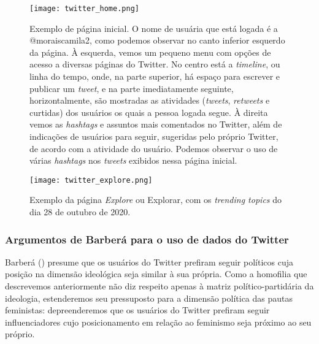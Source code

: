 \documentclass[
	12pt,				%
	openright,			%
	twoside,			%
	a4paper,			%
	english,			%
	brazil				%
	]{abntex2}
\begin{document}
 \begin{figure}[!htbp]
    \centering
    \texttt{[image: twitter\_home.png]}
    \caption{Exemplo de página inicial. O nome de usuária que está logada é a @moraiscamila2, como podemos observar no canto inferior esquerdo da página. À esquerda, vemos um pequeno menu com opções de acesso a diversas páginas do Twitter. No centro está a \emph{timeline}, ou linha do tempo, onde, na parte superior, há espaço para escrever e publicar um \emph{tweet}, e na parte imediatamente seguinte, horizontalmente, são mostradas as atividades (\emph{tweets}, \emph{retweets} e curtidas) dos usuários os quais a pessoa logada segue. À direita vemos as \emph{hashtags} e assuntos mais comentados no Twitter, além de indicações de usuários para seguir, sugeridas pelo próprio Twitter, de acordo com a atividade do usuário. Podemos observar o uso de várias \emph{hashtags} nos \emph{tweets} exibidos nessa página inicial.}
    \label{fig:home}
 \end{figure}

 \begin{figure}[!htbp]
    \centering
    \texttt{[image: twitter\_explore.png]}
    \caption{Exemplo da página \emph{Explore} ou Explorar, com os \emph{trending topics} do dia 28 de outubro de 2020.}
    \label{fig:explore}
 \end{figure}

 \newpage
 \subsubsection{Argumentos de Barberá para o uso de dados do Twitter}
 Barberá (\citeyear{barbera2015}) presume que os usuários do Twitter prefiram seguir políticos cuja posição na dimensão ideológica seja similar à sua própria. Como a homofilia que descrevemos anteriormente não diz respeito apenas à matriz político-partidária da ideologia, estenderemos seu pressuposto para a dimensão política das pautas feministas: depreenderemos que os usuários do Twitter prefiram seguir influenciadores cujo posicionamento em relação ao feminismo seja próximo ao seu próprio.
 
\end{document}

